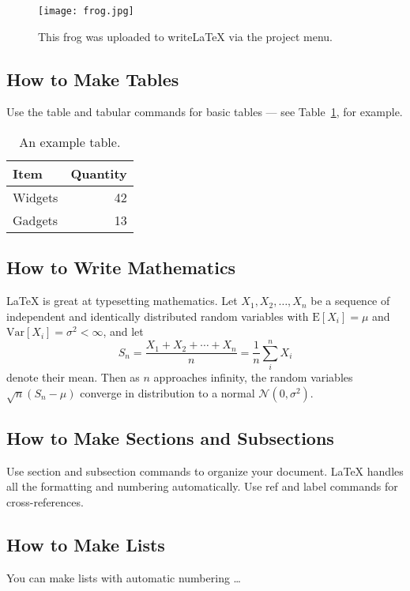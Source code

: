 \documentclass[a4paper]{article}
\begin{document}
\begin{figure}
\centering
\texttt{[image: frog.jpg]}
\caption{\label{fig:frog}This frog was uploaded to writeLaTeX via the project menu.}
\end{figure}

\subsection{How to Make Tables}

Use the table and tabular commands for basic tables --- see Table~\ref{tab:widgets}, for example.

\begin{table}
\centering
\begin{tabular}{l|r}
Item & Quantity \\\hline
Widgets & 42 \\
Gadgets & 13
\end{tabular}
\caption{\label{tab:widgets}An example table.}
\end{table}

\subsection{How to Write Mathematics}

\LaTeX{} is great at typesetting mathematics. Let $X_1, X_2, \ldots, X_n$ be a sequence of independent and identically distributed random variables with $\text{E}[X_i] = \mu$ and $\text{Var}[X_i] = \sigma^2 < \infty$, and let
$$S_n = \frac{X_1 + X_2 + \cdots + X_n}{n}
      = \frac{1}{n}\sum_{i}^{n} X_i$$
denote their mean. Then as $n$ approaches infinity, the random variables $\sqrt{n}(S_n - \mu)$ converge in distribution to a normal $\mathcal{N}(0, \sigma^2)$.

\subsection{How to Make Sections and Subsections}

Use section and subsection commands to organize your document. \LaTeX{} handles all the formatting and numbering automatically. Use ref and label commands for cross-references.

\subsection{How to Make Lists}

You can make lists with automatic numbering \dots
\end{document}
